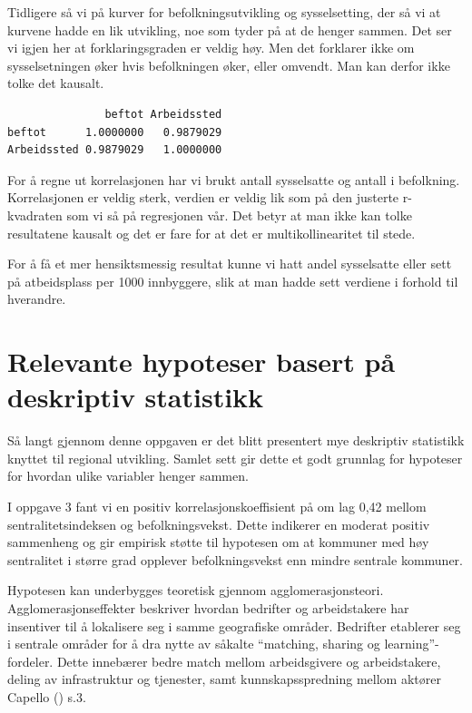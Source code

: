 \documentclass[
  norsk,
  letterpaper,
  DIV=11,
  numbers=noendperiod]{scrartcl}
\begin{document}
Tidligere så vi på kurver for befolkningsutvikling og sysselsetting, der
så vi at kurvene hadde en lik utvikling, noe som tyder på at de henger
sammen. Det ser vi igjen her at forklaringsgraden er veldig høy. Men det
forklarer ikke om sysselsetningen øker hvis befolkningen øker, eller
omvendt. Man kan derfor ikke tolke det kausalt.

\begin{verbatim}
               beftot Arbeidssted
beftot      1.0000000   0.9879029
Arbeidssted 0.9879029   1.0000000
\end{verbatim}

For å regne ut korrelasjonen har vi brukt antall sysselsatte og antall i
befolkning. Korrelasjonen er veldig sterk, verdien er veldig lik som på
den justerte r-kvadraten som vi så på regresjonen vår. Det betyr at man
ikke kan tolke resultatene kausalt og det er fare for at det er
multikollinearitet til stede.

For å få et mer hensiktsmessig resultat kunne vi hatt andel sysselsatte
eller sett på atbeidsplass per 1000 innbyggere, slik at man hadde sett
verdiene i forhold til hverandre.

\section{Relevante hypoteser basert på deskriptiv
statistikk}\label{relevante-hypoteser-basert-puxe5-deskriptiv-statistikk}

Så langt gjennom denne oppgaven er det blitt presentert mye deskriptiv
statistikk knyttet til regional utvikling. Samlet sett gir dette et godt
grunnlag for hypoteser for hvordan ulike variabler henger sammen.

I oppgave 3 fant vi en positiv korrelasjonskoeffisient på om lag 0,42
mellom sentralitetsindeksen og befolkningsvekst. Dette indikerer en
moderat positiv sammenheng og gir empirisk støtte til hypotesen om at
kommuner med høy sentralitet i større grad opplever befolkningsvekst enn
mindre sentrale kommuner.

Hypotesen kan underbygges teoretisk gjennom agglomerasjonsteori.
Agglomerasjonseffekter beskriver hvordan bedrifter og arbeidstakere har
insentiver til å lokalisere seg i samme geografiske områder. Bedrifter
etablerer seg i sentrale områder for å dra nytte av såkalte ``matching,
sharing og learning''-fordeler. Dette innebærer bedre match mellom
arbeidsgivere og arbeidstakere, deling av infrastruktur og tjenester,
samt kunnskapsspredning mellom aktører Capello
() s.3.
\end{document}

